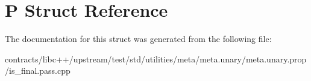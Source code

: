 \hypertarget{struct_p}{}\section{P Struct Reference}
\label{struct_p}


The documentation for this struct was generated from the following file\+:\begin{DoxyCompactItemize}
\item 
contracts/libc++/upstream/test/std/utilities/meta/meta.\+unary/meta.\+unary.\+prop/is\+\_\+final.\+pass.\+cpp\end{DoxyCompactItemize}
